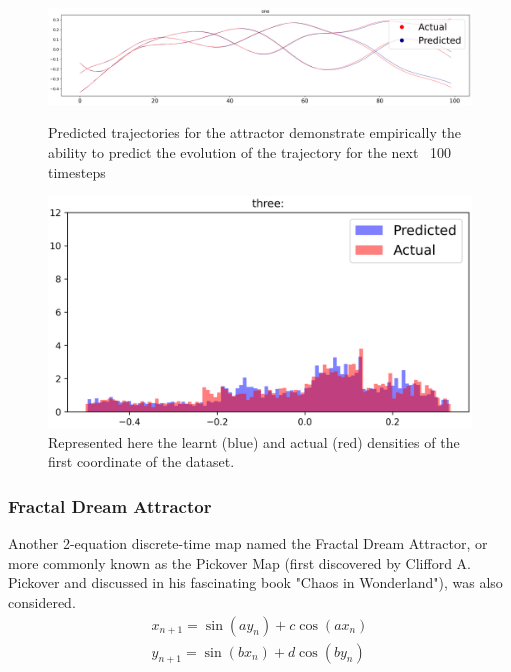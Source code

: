 \documentclass[a4paper,12pt,twoside]{report}
\begin{document}
\begin{figure}[ht]
  \centering
  \includegraphics[scale=0.35]{Thomas_1.eps}\caption*{Predicted trajectories for the attractor demonstrate empirically the ability to predict the evolution of the trajectory for the next ~100 timesteps}
  \includegraphics[scale=0.5]{Thomas_3.eps}\caption*{Represented here the learnt (blue) and actual (red) densities of the first coordinate of the dataset.}
\end{figure}


\subsubsection{Fractal Dream Attractor}

Another 2-equation discrete-time map named the Fractal Dream Attractor, or more commonly known as the Pickover Map (first discovered by Clifford A. Pickover and discussed in his fascinating book "Chaos in Wonderland"\cite{PickoverChaos}), was also considered.
\begin{eqnarray}\label{eqns_clifford}
  {x_{n+1}=\sin(ay_n) + c\cos(ax_n)} \\
  {y_{n+1}=\sin(bx_n)+d\cos(by_n)}
\end{eqnarray}
\end{document}
